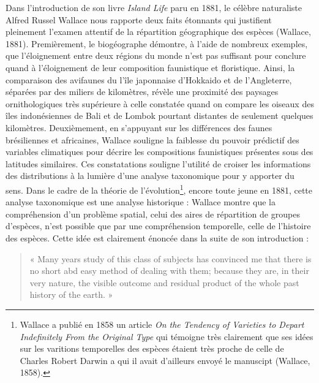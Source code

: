 Dans l'introduction de son livre \emph{Island Life} paru en 1881, le
célèbre naturaliste Alfred Russel Wallace nous rapporte deux faits
étonnants qui justifient pleinement l'examen attentif de la répartition
géographique des espèces (Wallace, 1881). Premièrement, le biogéographe
démontre, à l'aide de nombreux exemples, que l'éloignement entre deux
régions du monde n'est pas suffisant pour conclure quand à l'éloignement
de leur composition faunistique et floristique. Ainsi, la comparaison
des avifaunes du l'île japonnaise d'Hokkaido et de l'Angleterre,
séparées par des miliers de kilomètres, révèle une proximité des
paysages ornithologiques très supérieure à celle constatée quand on
compare les oiseaux des îles indonésiennes de Bali et de Lombok pourtant
distantes de seulement quelques kilomètres. Deuxièmement, en s'appuyant
sur les différences des faunes brésiliennes et africaines, Wallace
souligne la faiblesse du pouvoir prédictif des variables climatiques
pour décrire les compositions faunistiques présentes sous des latitudes
similaires. Ces constatations souligne l'utilité de croiser les
informations des distributions à la lumière d'une analyse taxonomique
pour y apporter du sens. Dans le cadre de la théorie de
l'évolution\footnote{Wallace a publié en 1858 un article \emph{On the
  Tendency of Varieties to Depart Indefinitely From the Original Type}
  qui témoigne très clairement que ses idées sur les varitions
  temporelles des espèces étaient très proche de celle de Charles Robert
  Darwin a qui il avait d'ailleurs envoyé le manuscipt (Wallace, 1858).},
encore toute jeune en 1881, cette analyse taxonomique est une analyse
historique : Wallace montre que la compréhension d'un problème spatial,
celui des aires de répartition de groupes d'espèces, n'est possible que
par une compréhension temporelle, celle de l'histoire des espèces. Cette
idée est clairement énoncée dans la suite de son introduction :

\begin{quote}
« Many years study of this class of subjects has convinced me that there
is no short abd easy method of dealing with them; because they are, in
their very nature, the visible outcome and residual product of the whole
past history of the earth. »
\end{quote}

